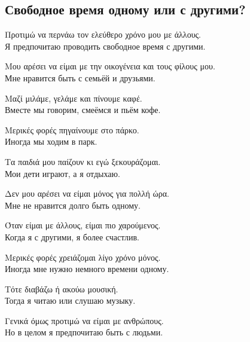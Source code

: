 \documentclass[12pt]{article}
\newcommand{\my}[1]{\textcolor{gray!80!white}{#1}}
\newenvironment{page}{\clearpage\normalsize\null\vfill}{\vfill\null}
\newenvironment{textblock}{\begin{minipage}{\textwidth}}{\end{minipage}\smallskip}
\begin{document}
	\begin{page}
		\subsection{Свободное время одному или с другими?}
		\small
		\begin{textblock}
			Προτιμώ να περνάω τον ελεύθερο χρόνο μου με άλλους.\\
			\my{Я предпочитаю проводить свободное время с другими.}
			
			Μου αρέσει να είμαι με την οικογένεια και τους φίλους μου.\\
			\my{Мне нравится быть с семьёй и друзьями.}
			
			Μαζί μιλάμε, γελάμε και πίνουμε καφέ.\\
			\my{Вместе мы говорим, смеёмся и пьём кофе.}
			
			Μερικές φορές πηγαίνουμε στο πάρκο.\\
			\my{Иногда мы ходим в парк.}
			
			Τα παιδιά μου παίζουν κι εγώ ξεκουράζομαι.\\
			\my{Мои дети играют, а я отдыхаю.}
			
			Δεν μου αρέσει να είμαι μόνος για πολλή ώρα.\\
			\my{Мне не нравится долго быть одному.}
			
			Όταν είμαι με άλλους, είμαι πιο χαρούμενος.\\
			\my{Когда я с другими, я более счастлив.}
			
			Μερικές φορές χρειάζομαι λίγο χρόνο μόνος.\\
			\my{Иногда мне нужно немного времени одному.}
			
			Τότε διαβάζω ή ακούω μουσική.\\
			\my{Тогда я читаю или слушаю музыку.}
			
			Γενικά όμως προτιμώ να είμαι με ανθρώπους.\\
			\my{Но в целом я предпочитаю быть с людьми.}
		\end{textblock}
	\end{page}
	
\end{document}
